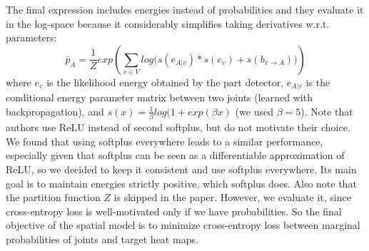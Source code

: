 \documentclass[a4paper,10pt]{article}
\begin{document}
	The final expression includes energies instead of probabilities and they evaluate it in the log-space because it considerably simplifies taking derivatives w.r.t. parameters:	
	\begin{equation*}
		\bar{p}_A = \frac{1}{Z} exp \left(  \sum_{v \in V}  log \Big( s(e_{A|v}) * s(e_v) + s(b_{v \rightarrow A})  \Big) \right)
	\end{equation*}
	where $e_v$ is the likelihood energy obtained by the part detector, $e_{A|v}$ is the conditional energy parameter matrix between two joints (learned with backpropagation), and $s(x) = \frac{1}{\beta} log(1 + exp(\beta x)$ (we used $\beta = 5$). Note that authors use ReLU instead of second softplus, but do not motivate their choice. We found that using softplus everywhere leads to a similar performance, especially given that softplus can be seen as a differentiable approximation of ReLU, so we decided to keep it consistent and use softplus everywhere. Its main goal is to maintain energies strictly positive, which softplus does. Also note that the partition function $Z$ is skipped in the paper. However, we evaluate it, since cross-entropy loss is well-motivated only if we have probabilities. So the final objective of the spatial model is to minimize cross-entropy loss between marginal probabilities of joints and target heat maps.
	
\end{document}
